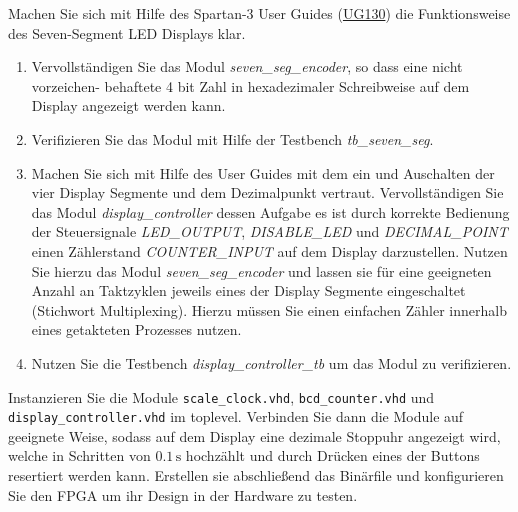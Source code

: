 \documentclass[12pt]{article}
\begin{document}


Machen Sie sich mit Hilfe des Spartan-3 User Guides (\href{https://www.xilinx.com/support/documentation/boards_and_kits/ug130.pdf}{UG130}) die Funktionsweise des Seven-Segment LED Displays
klar.


\begin{enumerate}[label=\alph*.)]


\item Vervollständigen Sie das Modul \textit{seven\_seg\_encoder}, so dass eine nicht vorzeichen-
behaftete 4 bit Zahl in hexadezimaler Schreibweise auf dem Display angezeigt werden kann.


\item Verifizieren Sie das Modul mit Hilfe der Testbench \textit{tb\_seven\_seg}.


\item Machen Sie sich mit Hilfe des User Guides mit dem ein und Auschalten der vier Display Segmente
und dem Dezimalpunkt vertraut. Vervollständigen Sie das Modul \textit{display\_controller} 
dessen Aufgabe es ist durch korrekte Bedienung der Steuersignale \textit{LED\_OUTPUT}, \textit{DISABLE\_LED} und \textit{DECIMAL\_POINT} einen Zählerstand \textit{COUNTER\_INPUT} auf dem Display darzustellen. Nutzen Sie hierzu das Modul 
\textit{seven\_seg\_encoder} und lassen sie für eine geeigneten Anzahl an Taktzyklen jeweils
eines der Display Segmente eingeschaltet (Stichwort Multiplexing). Hierzu müssen Sie einen einfachen Zähler innerhalb eines
getakteten Prozesses nutzen.


\item Nutzen Sie die Testbench \textit{display\_controller\_tb} um das Modul zu verifizieren.


\end{enumerate}







Instanzieren Sie die Module \texttt{scale\_clock.vhd}, \texttt{bcd\_counter.vhd} und \texttt{display\_controller.vhd} im toplevel.
Verbinden Sie dann die Module auf geeignete Weise, sodass auf dem Display eine dezimale Stoppuhr angezeigt wird, welche in Schritten von $0.1\,\mathrm{s}$ hochzählt und durch Drücken eines der Buttons resertiert werden kann.
Erstellen sie abschließend das Binärfile und konfigurieren Sie den FPGA um ihr Design in der Hardware zu testen.
\end{document}
